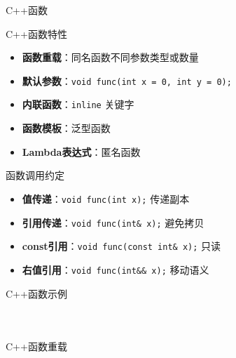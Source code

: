 \documentclass[UTF8,aspectratio=169]{beamer}
\begin{document}
\begin{frame}{C++函数}
    \begin{ytublock}{C++函数特性}
        \begin{itemize}
            \item \textbf{函数重载}：同名函数不同参数类型或数量
            \item \textbf{默认参数}：\texttt{void func(int x = 0, int y = 0);}
            \item \textbf{内联函数}：\texttt{inline} 关键字
            \item \textbf{函数模板}：泛型函数
            \item \textbf{Lambda表达式}：匿名函数
        \end{itemize}
    \end{ytublock}

    \begin{ytublock}{函数调用约定}
        \begin{itemize}
            \item \textbf{值传递}：\texttt{void func(int x);} 传递副本
            \item \textbf{引用传递}：\texttt{void func(int\& x);} 避免拷贝
            \item \textbf{const引用}：\texttt{void func(const int\& x);} 只读
            \item \textbf{右值引用}：\texttt{void func(int\&\& x);} 移动语义
        \end{itemize}
    \end{ytublock}
\end{frame}

\begin{frame}[fragile]{C++函数示例}
    \begin{columns}
        \begin{column}{0.48\textwidth}
                \inputminted[firstline=1,lastline=18]{cpp}{code/cpp_function_basic.cpp}
        \end{column}
        \begin{column}{0.48\textwidth}
                \inputminted[firstline=20,lastline=36]{cpp}{code/cpp_function_basic.cpp}
        \end{column}
    \end{columns}
\end{frame}

\begin{frame}[fragile]{C++函数重载}
    \begin{columns}
        \begin{column}{0.48\textwidth}
            \inputminted[firstline=1,lastline=20]{cpp}{code/cpp_function_overload.cpp}
        \end{column}
        \begin{column}{0.48\textwidth}
                \inputminted[firstline=21,lastline=37]{cpp}{code/cpp_function_overload.cpp}
        \end{column}
    \end{columns}
\end{frame}
\end{document}
